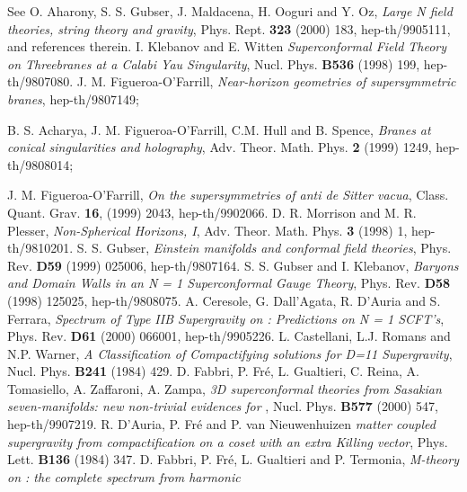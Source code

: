 \documentclass[a4paper,12pt]{article}
\begin{document}
\begin{thebibliography}{99}
 See O. Aharony, S. S. Gubser, J. Maldacena, H. Ooguri and Y. Oz,
{\it Large N field theories, string theory and gravity},
Phys. Rept. {\bf 323} (2000) 183,
hep-th/9905111, and references therein.
 I. Klebanov and E. Witten {\it Superconformal Field
Theory on Threebranes at a Calabi Yau Singularity},
Nucl. Phys. {\bf B536} (1998) 199, hep-th/9807080.
 J. M. Figueroa-O'Farrill, {\it Near-horizon geometries
of supersymmetric branes}, hep-th/9807149;
\par B. S. Acharya, J. M. Figueroa-O'Farrill, C.M. Hull and B. Spence,
{\it Branes at conical singularities and holography},
Adv. Theor. Math. Phys. {\bf 2} (1999) 1249, hep-th/9808014;
\par J. M. Figueroa-O'Farrill, {\it On the supersymmetries of anti de Sitter vacua},
Class. Quant. Grav. {\bf 16}, (1999) 2043, hep-th/9902066.
 D. R. Morrison and M. R. Plesser, {\it Non-Spherical Horizons, I},
Adv. Theor. Math. Phys. {\bf 3} (1998) 1, hep-th/9810201.
 S. S. Gubser,
{\it Einstein manifolds and conformal field theories},
Phys. Rev. {\bf D59} (1999) 025006, hep-th/9807164.
 S. S. Gubser and I. Klebanov,
{\it Baryons and Domain Walls in an N = 1 Superconformal Gauge Theory},
Phys. Rev. {\bf D58} (1998) 125025, hep-th/9808075.
 A. Ceresole, G. Dall'Agata, R. D'Auria and S. Ferrara,
{\it Spectrum of Type IIB Supergravity on \coordHE{}:
Predictions on N = 1 SCFT's}, Phys. Rev. {\bf D61} (2000) 066001,
hep-th/9905226.
 L. Castellani, L.J. Romans and N.P. Warner, {\it
A Classification of Compactifying solutions for D=11 Supergravity},
Nucl. Phys. {\bf B241} (1984) 429.
 D. Fabbri, P. Fr\'e, L. Gualtieri, C. Reina, A. Tomasiello,
 A. Zaffaroni, A. Zampa, {\it 3D superconformal theories from Sasakian
 seven-manifolds: new non-trivial evidences for \coordHE{}},
 Nucl. Phys. {\bf B577} (2000) 547, hep-th/9907219.
 R. D'Auria, P. Fr\'e and P. van Nieuwenhuizen
{\it {}\coordHE{} matter coupled supergravity from compactification on a coset
with an extra Killing vector}, Phys. Lett. {\bf B136} (1984) 347.
 D. Fabbri, P. Fr\'e, L. Gualtieri and P. Termonia,
 {\it M-theory on \coordHE{}: the complete
 \coordHE{} spectrum from harmonic
}
\end{thebibliography}
\end{document}
